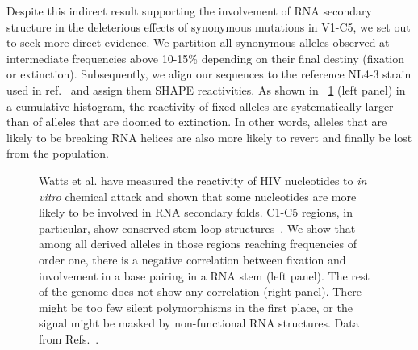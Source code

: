 \documentclass[12pt,a4paper,notitlepage,onecolumn]{article}
\begin{document}
Despite this indirect result supporting the involvement of RNA secondary
structure in the deleterious effects of synonymous mutations in V1-C5, we set
out to seek more direct evidence. We partition all synonymous alleles observed
at intermediate frequencies above 10-15\% depending on their final destiny
(fixation or extinction). Subsequently, we align our sequences to the reference
NL4-3 strain used in ref.~\citep{watts_architecture_2009} and assign them SHAPE
reactivities. As shown in \figurename~\ref{fig:SHAPE} (left panel) in a
cumulative histogram, the reactivity of fixed alleles are systematically larger
than of alleles that are doomed to extinction. In other words, alleles that are
likely to be breaking RNA helices are also more likely to revert and finally be
lost from the population.
\begin{figure}
\begin{center}
\caption{Watts et al. have measured the reactivity of HIV nucleotides to {\it
in vitro} chemical attack and shown that some nucleotides are more likely to
be involved in RNA secondary folds. C1-C5 regions, in particular, show
conserved stem-loop structures~\citep{watts_architecture_2009}. We show that
among all derived alleles in those regions reaching frequencies of order one,
there is a negative correlation between fixation and involvement in a base
pairing in a RNA stem (left panel). The rest of the genome does not show any
correlation (right panel). There might be too few silent polymorphisms in the
first place, or the signal might be masked by non-functional RNA
structures. Data from Refs.~\cite{shankarappa_consistent_1999,
bunnik_autologous_2008, liu_selection_2006}.}
\label{fig:SHAPE}
\end{center}
\end{figure}
\end{document}
